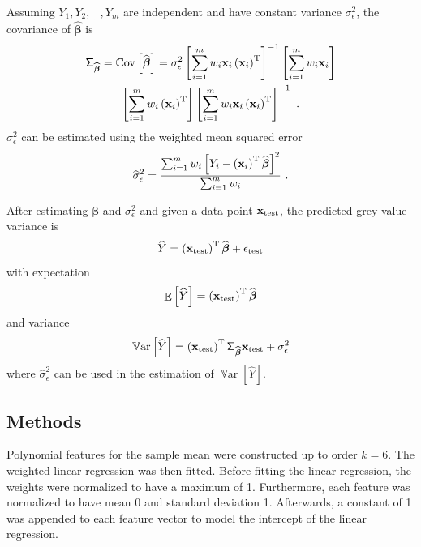 \documentclass[12pt]{report}
\DeclareMathOperator{\expectation}{\mathbb{E}}
\DeclareMathOperator{\variance}{\mathbb{V}ar}
\DeclareMathOperator{\cov}{\mathbb{C}ov}
\newcommand{\T}{^\textup{T}}
\newcommand{\dotdotdot}{_{\phantom{.}\cdots}}
\newcommand{\vect}[1]{\mathbf{#1}}
\newcommand{\vectGreek}[1]{\boldsymbol{#1}}
\newcommand{\matr}[1]{\mathsf{#1}}
\begin{document}
Assuming $Y_1,Y_2,\dotdotdot,Y_m$ are independent and have constant variance $\sigma_\epsilon^2$, the covariance of $\widehat{\vectGreek{\beta}}$ is
\begin{multline}
\matr{\Sigma}_{\widehat{\vectGreek{\beta}}}=\cov\left[\widehat{\vectGreek{\beta}}\right]=
\sigma_\epsilon^2\left[\sum_{i=1}^mw_i\vect{x}_i\left(\vect{x}_i\right)\T\right]^{-1}\left[\sum_{i=1}^mw_i\vect{x}_i\right]
\\
\left[\sum_{i=1}^mw_i\left(\vect{x}_i\right)\T\right]\left[\sum_{i=1}^mw_i\vect{x}_i\left(\vect{x}_i\right)\T\right]^{-1} \ .
\end{multline}
$\sigma_\epsilon^2$ can be estimated using the weighted mean squared error
\begin{equation}
\widehat{\sigma}_\epsilon^2=\frac{\sum_{i=1}^mw_i\left[Y_i-\left(\vect{x}_i\right)\T\widehat{\vectGreek{\beta}}\right]^2}{\sum_{i=1}^mw_i} \ .
\end{equation}

After estimating $\vectGreek{\beta}$ and $\sigma_\epsilon^2$ and given a data point $\vect{x}_{\textup{test}}$, the predicted grey value variance is
\begin{equation}
\widehat{Y}=\left(\vect{x}_{\textup{test}}\right)\T\widehat{\vectGreek{\beta}} + \epsilon_{\textup{test}}
\end{equation}
with expectation
\begin{equation}
\expectation\left[{\widehat{Y}}\right]=\left(\vect{x}_{\textup{test}}\right)\T\widehat{\vectGreek{\beta}}
\end{equation}
and variance
\begin{equation}
\variance\left[\widehat{Y}\right]=\left(\vect{x}_{\textup{test}}\right)\T\matr{\Sigma}_{\widehat{\vectGreek{\beta}}}\vect{x}_{\textup{test}}+\sigma_\epsilon^2
\end{equation}
where $\widehat{\sigma}_\epsilon^2$ can be used in the estimation of $\variance\left[\widehat{Y}\right]$.

\subsection{Methods}
Polynomial features for the sample mean were constructed up to order $k=6$. The weighted linear regression was then fitted. Before fitting the linear regression, the weights were normalized to have a maximum of 1. Furthermore, each feature was normalized to have mean 0 and standard deviation 1. Afterwards, a constant of 1 was appended to each feature vector to model the intercept of the linear regression.
\end{document}
